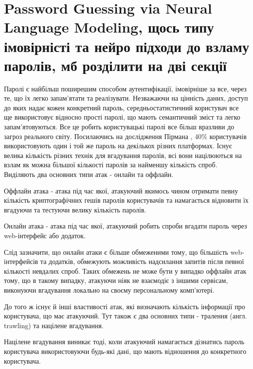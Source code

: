 \section{Password Guessing via Neural Language Modeling, щось типу імовірністі та нейро підходи до взламу паролів, мб розділити на дві секції}  
Паролі є найбільш поширешим способом аутентифікації, імовірніше за все, через те, що їх легко запам'ятати та реалізувати. Незважаючи на цінність даних, доступ до яких надає кожен конкретний пароль, середньостатистичний користувач все ще використовує відносно прості паролі, що мають семантичний зміст та легко запам'ятовуються. Все це робить користувацькі паролі все більш вразливи до загроз реального світу. Посилаючись на дослідження Пірмана \cite{Observing passwords in their natural habitat}, 40\% користувачів використовують один і той же пароль на декількох різних платформах. Існує велика кількість різних технік для вгадування паролів, всі вони націлюються на взлам як можна більшої кількості паролів за найменшу кількість спроб. Виділяють два основних типи атак - онлайн та оффлайн. 

\begin{definition}
Оффлайн атака - атака під час якої, атакуючий якимось чином отримати певну кількість криптографічних гешів паролів користувачів та намагається відновити їх вгадуючи та тестуючи велику кількість паролів.
\end{definition}

\begin{definition}
Онлайн атака - атака під час якої, атакуючий робить спроби вгадати пароль через web-інтерфейс або додаток.
\end{definition}

\begin{remark}
Слід зазначити, що онлайн атаки є більше обмеженими тому, що більшість web-інтерфейсів та додатків, обмежують можливість надсилання запитів після певної кількості невдалих спроб. Таких обмежень не може бути у випадко оффлайн атак тому, що в такому випадку, атакуючи ніяк не взаємодіє з іншими сервісам, виконуючи вгадування локально на своєму персональному комп'ютері. 
\end{remark}

До того ж існує й інші властивості атак, які визначають кількість інформації про користувача, що має атакуючий. Тут також є два основних типи - тралення (англ. trawling) та націлене вгадування.

\begin{definition}
Націлене вгадування виникає тоді, коли атакуючий намагається дізнатись пароль користувача використовуючи будь-які дані, що мають відношення до конкретного користувача.    
\end{definition}

